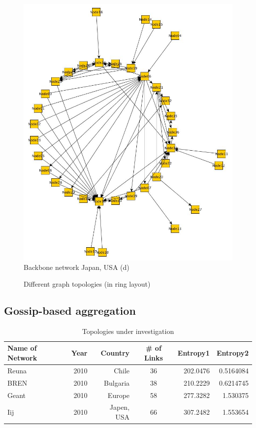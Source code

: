 \begin{figure}[h!]
\begin{minipage}[c]{0.45\textwidth}
    \includegraphics[width=\linewidth]{Iij.jpg}
    Backbone network Japan, USA (d)
    \end{minipage}
   \caption{Different graph topologies (in ring layout)}
   \label{fig:graphs}
\end{figure}
\subsection{Gossip-based aggregation}
\begin{table}
\centering
\begin{tabular}{lrrcrr}
	\hline
	Name of Network & Year & Country & \# of Links & Entropy1 & Entropy2\\
    \hline
    Reuna & 2010 & Chile & 36 & 202.0476 & 0.5164084\\
    BREN & 2010 & Bulgaria & 38 & 210.2229 & 0.6214745\\
    Geant & 2010 & Europe & 58 & 277.3282 & 1.530375\\
    Iij & 2010 & Japen, USA & 66 & 307.2482 & 1.553654\\
    \hline
\end{tabular}
\caption{Topologies under investigation}
\label{table:network}
\end{table}

